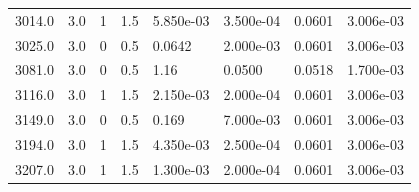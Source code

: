 \documentclass[preview]{standalone}
\begin{document}
{{\begin{tabular}{L{1.2cm}C{1.2cm} C{0.3cm}C{0.5cm} C{1.4cm}C{1.4cm} C{1.4cm}C{1.4cm}}
  3014.0  &   3.0  & 1     & 1.5 &  5.850e-03  & 3.500e-04  & 0.0601 &  3.006e-03   \\ 
  3025.0  &   3.0  & 0     & 0.5 &  0.0642  & 2.000e-03  & 0.0601 &  3.006e-03   \\ 
  3081.0  &   3.0  & 0     & 0.5 &  1.16  & 0.0500  & 0.0518 &  1.700e-03   \\ 
  3116.0  &   3.0  & 1     & 1.5 &  2.150e-03  & 2.000e-04  & 0.0601 &  3.006e-03   \\ 
  3149.0  &   3.0  & 0     & 0.5 &  0.169  & 7.000e-03  & 0.0601 &  3.006e-03   \\ 
  3194.0  &   3.0  & 1     & 1.5 &  4.350e-03  & 2.500e-04  & 0.0601 &  3.006e-03   \\ 
  3207.0  &   3.0  & 1     & 1.5 &  1.300e-03  & 2.000e-04  & 0.0601 &  3.006e-03   \\ 
\hline 
\end{tabular} 

}}
\end{document}
